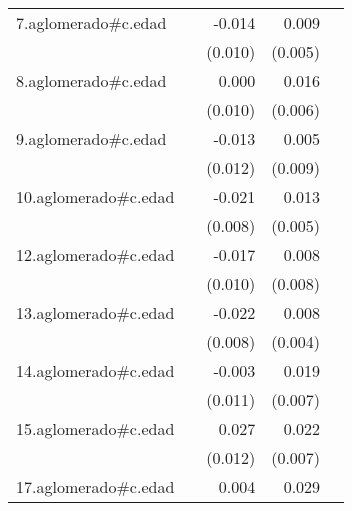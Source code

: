 {\begin{longtable}{l*{4}{D{.}{.}{-1}}}
\addlinespace
7.aglomerado#c.edad&                     &      -0.014         &       0.009         &                     \\
            &                     &     (0.010)         &     (0.005)         &                     \\
\addlinespace
8.aglomerado#c.edad&                     &       0.000         &       0.016\sym{**} &                     \\
            &                     &     (0.010)         &     (0.006)         &                     \\
\addlinespace
9.aglomerado#c.edad&                     &      -0.013         &       0.005         &                     \\
            &                     &     (0.012)         &     (0.009)         &                     \\
\addlinespace
10.aglomerado#c.edad&                     &      -0.021\sym{*}  &       0.013\sym{*}  &                     \\
            &                     &     (0.008)         &     (0.005)         &                     \\
\addlinespace
12.aglomerado#c.edad&                     &      -0.017         &       0.008         &                     \\
            &                     &     (0.010)         &     (0.008)         &                     \\
\addlinespace
13.aglomerado#c.edad&                     &      -0.022\sym{**} &       0.008         &                     \\
            &                     &     (0.008)         &     (0.004)         &                     \\
\addlinespace
14.aglomerado#c.edad&                     &      -0.003         &       0.019\sym{**} &                     \\
            &                     &     (0.011)         &     (0.007)         &                     \\
\addlinespace
15.aglomerado#c.edad&                     &       0.027\sym{*}  &       0.022\sym{**} &                     \\
            &                     &     (0.012)         &     (0.007)         &                     \\
\addlinespace
17.aglomerado#c.edad&                     &       0.004         &       0.029\sym{**} &                     \\

\end{longtable}}
